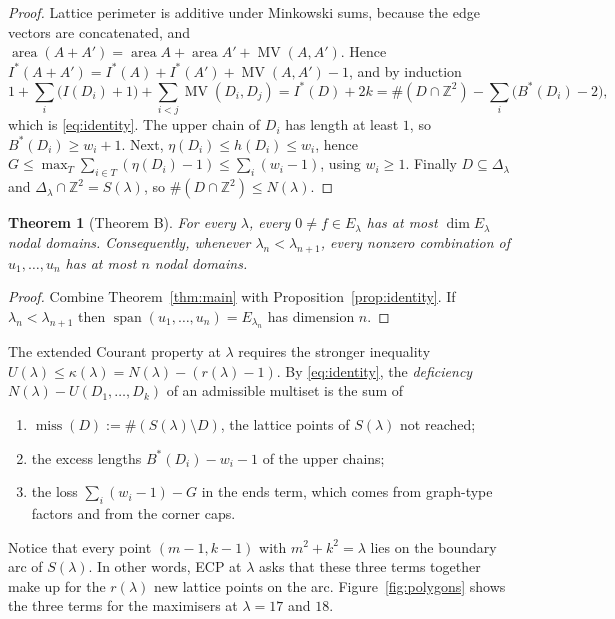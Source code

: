 \documentclass[11pt]{amsart}
\newtheorem{theorem}{Theorem}[section]
\theoremstyle{definition}
\theoremstyle{remark}
\newcommand{\Z}{\mathbb{Z}}
\newcommand{\MV}{\operatorname{MV}}
\newcommand{\miss}{\operatorname{miss}}
\numberwithin{equation}{section}
\begin{document}
\begin{proof}
Lattice perimeter is additive under Minkowski sums, because the edge vectors are
concatenated, and $\operatorname{area}(A+A')=\operatorname{area}A+\operatorname{area}A'+\MV(A,A')$.
Hence $I^*(A+A')=I^*(A)+I^*(A')+\MV(A,A')-1$, and by induction
\[
1+\sum_i\bigl(I(D_i)+1\bigr)+\sum_{i<j}\MV(D_i,D_j)=I^*(D)+2k
=\#(D\cap\Z^2)-\sum_i\bigl(B^*(D_i)-2\bigr),
\]
which is \eqref{eq:identity}. The upper chain of $D_i$ has length at least $1$, so
$B^*(D_i)\ge w_i+1$. Next, $\eta(D_i)\le h(D_i)\le w_i$, hence
$G\le\max_T\sum_{i\in T}(\eta(D_i)-1)\le\sum_i(w_i-1)$, using $w_i\ge1$. Finally
$D\subseteq\Delta_\lambda$ and $\Delta_\lambda\cap\Z^2=S(\lambda)$, so
$\#(D\cap\Z^2)\le N(\lambda)$.
\end{proof}

\begin{theorem}[Theorem B]\label{thm:CH}
For every $\lambda$, every $0\ne f\in E_\lambda$ has at most $\dim E_\lambda$ nodal domains.
Consequently, whenever $\lambda_n<\lambda_{n+1}$, every nonzero combination of
$u_1,\dots,u_n$ has at most $n$ nodal domains.
\end{theorem}

\begin{proof}
Combine Theorem~\ref{thm:main} with Proposition~\ref{prop:identity}. If
$\lambda_n<\lambda_{n+1}$ then $\operatorname{span}(u_1,\dots,u_n)=E_{\lambda_n}$ has dimension $n$.
\end{proof}

The extended Courant property at $\lambda$ requires the stronger inequality
$U(\lambda)\le\kappa(\lambda)=N(\lambda)-(r(\lambda)-1)$. By \eqref{eq:identity}, the
\emph{deficiency} $N(\lambda)-U(D_1,\dots,D_k)$ of an admissible multiset is the sum of
\begin{enumerate}[nosep]
\item $\miss(D):=\#(S(\lambda)\setminus D)$, the lattice points of $S(\lambda)$ not reached;
\item the excess lengths $B^*(D_i)-w_i-1$ of the upper chains;
\item the loss $\sum_i(w_i-1)-G$ in the ends term, which comes from graph-type factors and
from the corner caps.
\end{enumerate}
Notice that every point $(m-1,k-1)$ with $m^2+k^2=\lambda$ lies on the boundary arc of
$S(\lambda)$. In other words, ECP at $\lambda$ asks that these three terms together make up for
the $r(\lambda)$ new lattice points on the arc. Figure~\ref{fig:polygons} shows the three
terms for the maximisers at $\lambda=17$ and $18$.
\end{document}
